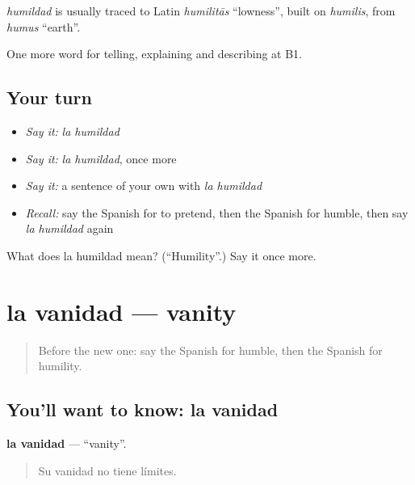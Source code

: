 \begin{cousinweb}
\emph{humildad} is usually traced to Latin \emph{humilitās} \textquotedblleft{}lowness\textquotedblright{}, built on \emph{humilis}, from \emph{humus} \textquotedblleft{}earth\textquotedblright{}.
\end{cousinweb}

\begin{grammarlens}[title={What you've built}]
One more word for telling, explaining and describing at B1.
\end{grammarlens}

\subsection*{Your turn}
\begin{itemize}
\raggedright
  \item \emph{Say it:} \emph{la humildad}
  \item \emph{Say it:} \emph{la humildad}, once more
  \item \emph{Say it:} a sentence of your own with \emph{la humildad}
  \item \emph{Recall:} say the Spanish for to pretend, then the Spanish for humble, then say \emph{la humildad} again
\end{itemize}

\begin{tcolorbox}[breakable,colback=teal!4,colframe=teal!35!black,title={Before you move on}]
What does la humildad mean? (\textquotedblleft{}Humility\textquotedblright{}.) Say it once more.
\end{tcolorbox}
\section[la vanidad]{la vanidad — vanity}

\label{lesson:ES-C726-vanidad}



\begin{quote}
Before the new one: say the Spanish for humble, then the Spanish for humility.
\end{quote}

\subsection*{You'll want to know: la vanidad}
\textbf{la vanidad} — \textquotedblleft{}vanity\textquotedblright{}.

\begin{quote}
Su vanidad no tiene límites.
\end{quote}

